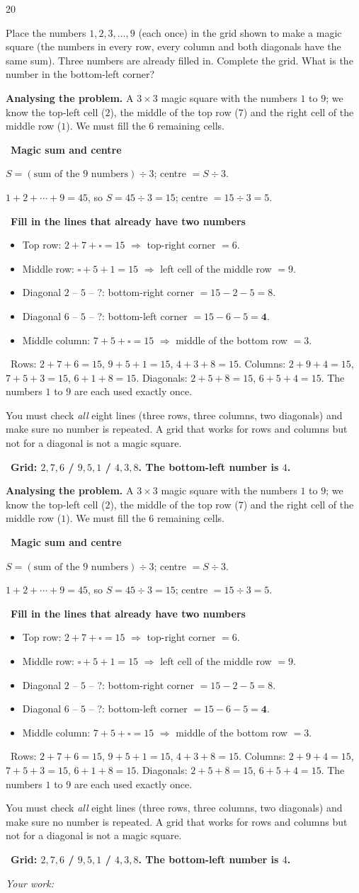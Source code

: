 \documentclass[11pt]{article}
\newif\ifsol \soltrue
\providecommand{\AnsWord}{Đáp số}
\newenvironment{probbox}[2]{\begin{probboxT}{#1}{#2}}{\end{probboxT}}
\newcommand{\StuProb}[2]{\begin{probboxS}{#1}{#2}\StuProbBody\end{probboxS}}
\newcommand{\ans}[1]{\par\smallskip{\bfseries\color{tmGreen!88!black}\AnsWord:}\ {\bfseries\color{AnsRed}#1}\par}
\newcommand{\probsol}[1]{%
  \begin{lrbox}{\solmeasure}\begin{minipage}{\dimexpr\linewidth-24pt\relax}#1\end{minipage}\end{lrbox}%
  \ifsol
    \begin{solbox}#1\end{solbox}%
  \else
    \setlength{\solht}{\dimexpr\ht\solmeasure+\dp\solmeasure+0.85cm\relax}%
    \ifdim\solht<1.35cm\setlength{\solht}{1.35cm}\fi
    \ifdim\solht>\StudentMaxWork\setlength{\solht}{\StudentMaxWork}\fi
    \par\noindent\begin{minipage}{\linewidth}%
    \expandafter\StuProb\StuProbArgs
    \begin{tcolorbox}[colback=white,colframe=Line,boxrule=0.8pt,arc=5pt,
      left=8pt,right=8pt,top=4pt,bottom=4pt,height=\solht]{\footnotesize\color{Slate}\itshape\WorkWord}\end{tcolorbox}%
    \end{minipage}\par\medskip
  \fi}
\newlength{\StudentMaxWork}\setlength{\StudentMaxWork}{4.5cm}
\newcommand{\step}[2]{\par\smallskip\noindent{\bfseries\color{tmBlue!85!black}\StepWord~#1.}\ {\bfseries #2}\par\nopagebreak}
\newcommand{\verify}[1]{\par\smallskip\noindent{\bfseries\color{tmGreen!80!black}\faCheckCircle\ \CheckWord}\ #1\par}
\def\WorkWord{Your work:}
\def\AnsWord{Answer}
\def\StepWord{Step}
\def\CheckWord{Check:}
\begin{document}
\begin{probbox}{20}{\relax}
\begin{minipage}[t]{0.63\linewidth}
Place the numbers $1, 2, 3, \ldots, 9$ (each once) in the grid shown to make a magic square (the numbers in every row, every column and both
diagonals have the same sum). Three numbers are already filled in. Complete the grid. What is the number in the bottom-left corner?
\end{minipage}\hfill
\begin{minipage}[t]{0.33\linewidth}\vspace{-4pt}\centering
{}
\end{minipage}
\end{probbox}
\probsol{
\textbf{Analysing the problem.} A $3\times 3$ magic square with the numbers $1$ to $9$; we know the top-left cell ($2$), the middle of the
top row ($7$) and the right cell of the middle row ($1$). We must fill the $6$ remaining cells.
\step{1}{Magic sum and centre}
\begin{recallbox}$S = (\text{sum of the } 9 \text{ numbers}) \div 3$; centre $= S \div 3$.\end{recallbox}
$1 + 2 + \cdots + 9 = 45$, so $S = 45 \div 3 = 15$; centre $= 15 \div 3 = 5$.
\step{2}{Fill in the lines that already have two numbers}
\begin{itemize}[leftmargin=1.4em,itemsep=1pt,topsep=1pt]
\item Top row: $2 + 7 + \square = 15$ $\Rightarrow$ top-right corner $= 6$.
\item Middle row: $\square + 5 + 1 = 15$ $\Rightarrow$ left cell of the middle row $= 9$.
\item Diagonal $2$ -- $5$ -- ?: bottom-right corner $= 15 - 2 - 5 = 8$.
\item Diagonal $6$ -- $5$ -- ?: bottom-left corner $= 15 - 6 - 5 = \mathbf{4}$.
\item Middle column: $7 + 5 + \square = 15$ $\Rightarrow$ middle of the bottom row $= 3$.
\end{itemize}
\begin{center}\lgaMagic{$2$}{$7$}{\textcolor{tmGreen!60!black}{$6$}}{\textcolor{tmGreen!60!black}{$9$}}{\textcolor{tmGreen!60!black}{$5$}}{$1$}{\textcolor{AnsRed}{$\mathbf{4}$}}{\textcolor{tmGreen!60!black}{$3$}}{\textcolor{tmGreen!60!black}{$8$}}\end{center}
\verify{Rows: $2 + 7 + 6 = 15$, $9 + 5 + 1 = 15$, $4 + 3 + 8 = 15$. Columns: $2 + 9 + 4 = 15$, $7 + 5 + 3 = 15$, $6 + 1 + 8 = 15$.
Diagonals: $2 + 5 + 8 = 15$, $6 + 5 + 4 = 15$. The numbers $1$ to $9$ are each used exactly once.}
\begin{warnbox}You must check \emph{all} eight lines (three rows, three columns, two diagonals) and make sure no number is repeated. A grid
that works for rows and columns but not for a diagonal is not a magic square.\end{warnbox}
\ans{Grid: $2, 7, 6$ / $9, 5, 1$ / $4, 3, 8$. The bottom-left number is $4$.}
}
\end{document}

